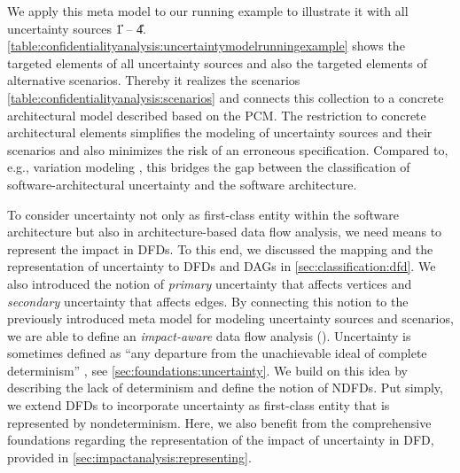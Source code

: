 We apply this meta model to our running example to illustrate it with all uncertainty sources \U{1} -- \U{4}.
\autoref{table:confidentialityanalysis:uncertaintymodelrunningexample} shows the targeted elements of all uncertainty sources and also the targeted elements of alternative scenarios.
Thereby it realizes the scenarios \autoref{table:confidentialityanalysis:scenarios} and connects this collection to a concrete architectural model described based on the \ac{PCM}.
The restriction to concrete architectural elements simplifies the modeling of uncertainty sources and their scenarios and also minimizes the risk of an erroneous specification.
Compared to, e.g., variation modeling \cite{mehl_palladio_2022,walter_architecture-based_2023}, this bridges the gap between the classification of software-architectural uncertainty and the software architecture.


To consider uncertainty not only as first-class entity within the software architecture but also in architecture-based data flow analysis, we need means to represent the impact in \acp{DFD}.
To this end, we discussed the mapping and the representation of uncertainty to \acp{DFD} and \acp{DAG} in \autoref{sec:classification:dfd}.
We also introduced the notion of \emph{primary} uncertainty that affects vertices and \emph{secondary} uncertainty that affects edges.
By connecting this notion to the previously introduced meta model for modeling uncertainty sources and scenarios, we are able to define an \emph{impact-aware} data flow analysis ().
Uncertainty is sometimes defined as \enquote{any departure from the unachievable ideal of complete determinism} \cite{walker_defining_2003}, see \autoref{sec:foundations:uncertainty}.
We build on this idea by describing the lack of determinism and define the notion of \acfp{NDFD}.
Put simply, we extend \acfp{DFD} to incorporate uncertainty as first-class entity that is represented by nondeterminism.
Here, we also benefit from the comprehensive foundations regarding the representation of the impact of uncertainty in \ac{DFD}, provided in \autoref{sec:impactanalysis:representing}.

